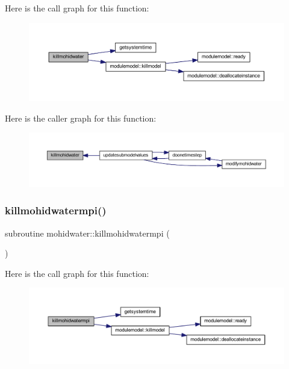 Here is the call graph for this function\+:\nopagebreak
\begin{figure}[H]
\begin{center}
\leavevmode
\includegraphics[width=350pt]{_main_8_f90_a5128f2face71ee4677d8367d5cb5b14b_cgraph}
\end{center}
\end{figure}
Here is the caller graph for this function\+:\nopagebreak
\begin{figure}[H]
\begin{center}
\leavevmode
\includegraphics[width=350pt]{_main_8_f90_a5128f2face71ee4677d8367d5cb5b14b_icgraph}
\end{center}
\end{figure}
\mbox{\label{_main_8_f90_afa8be84014e1a3928a646b3e9fc25c72}} 
\subsubsection{\texorpdfstring{killmohidwatermpi()}{killmohidwatermpi()}}
{\footnotesize\ttfamily subroutine mohidwater\+::killmohidwatermpi (\begin{DoxyParamCaption}{ }\end{DoxyParamCaption})}

Here is the call graph for this function\+:\nopagebreak
\begin{figure}[H]
\begin{center}
\leavevmode
\includegraphics[width=350pt]{_main_8_f90_afa8be84014e1a3928a646b3e9fc25c72_cgraph}
\end{center}
\end{figure}
\mbox{\label{_main_8_f90_acdc3261ecd63c8e82b3392ec60df4db9}} 
